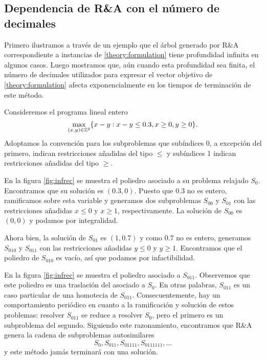 \subsection{Dependencia de R\&A con el número de decimales}
\label{subsec:inf:int}
\noindent
Primero ilustramos a través de un ejemplo que el árbol generado por R\&A correspondiente a instancias de
\eqref{theory:formulation} tiene profundidad infinita en algunos casos. Luego mostramos que, aún
cuando esta profundidad sea finita, el número de decimales utilizados para expresar el vector
objetivo de \eqref{theory:formulation} afecta exponencialmente en los tiempos de
terminación de este método.

\begin{example}
	\label{ex:inf}
	Consideremos el programa lineal entero
	\begin{equation*}
		\max_{(x, y) \in \mathbb{Z}^2}\lbrace x - y \vcentcolon x - y \leq 0.3, x \geq 0, y \geq 0 \rbrace.
	\end{equation*}
	Adoptamos la convención para los subproblemas que subíndices 0, a excepción del primero, indican
	restricciones añadidas del tipo $\leq$ y subíndices 1 indican restricciones añadidas del tipo
	$\geq$.

	En la figura \ref{fig:infrec} se muestra el poliedro asociado a su problema relajado $S_0$.
	Encontramos que su solución es $(0.3, 0)$. Puesto que $0.3$ no es entero, ramificamos sobre esta
	variable y generamos dos subproblemas $S_{00}$ y $S_{01}$ con las restricciones añadidas $x \leq
	0$ y $x \geq 1$, respectivamente. La solución de $S_{00}$ es $(0, 0)$ y podamos por
	integralidad.

	Ahora bien, la solución de $S_{01}$ es $(1, 0.7)$ y como $0.7$ no es entero, generamos $S_{010}$
	y $S_{011}$ con las restricciones añadidas $y \leq 0$ y $y \geq 1$. Encontramos que el poliedro
	de $S_{010}$ es vacío, así que podamos por infactibilidad.

	En la figura \ref{fig:infrec} se muestra el poliedro asociado a $S_{011}$. Observemos que este poliedro es
	una traslación del asociado a $S_0$. En otras palabras, $S_{011}$ es un caso particular de una
	homotecia de $S_{011}$. Consecuentemente, hay un comportamiento
	periódico en cuanto a la ramificación y solución de estos problemas: resolver $S_{011}$ se
	reduce a resolver $S_0$, pero el primero es un subproblema del segundo. Siguiendo este
	razonamiento, encontramos que R\&A genera la cadena de subproblemas autosimilares
	\begin{equation*}
		S_0, S_{011}, S_{01111}, S_{0111111}, \ldots
	\end{equation*}
	y este método jamás terminará con una solución.
\end{example}


